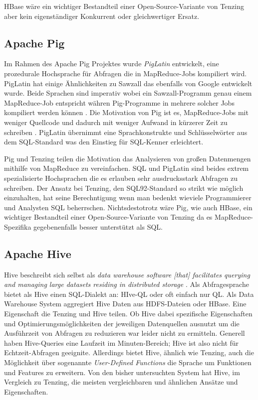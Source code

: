 \documentclass[a4paper]{article}
\begin{document}
HBase wäre ein wichtiger Bestandteil einer Open-Source-Variante von Tenzing aber kein eigenständiger Konkurrent oder gleichwertiger Ersatz.

\subsection{Apache Pig}
Im Rahmen des Apache Pig Projektes wurde \textit{PigLatin} entwickelt, eine prozedurale Hochsprache für Abfragen die in MapReduce-Jobs kompiliert wird. PigLatin hat einige Ähnlichkeiten zu Sawzall \cite{Sawzall} das ebenfalls von Google entwickelt wurde. Beide Sprachen sind imperativ wobei ein Sawzall-Programm genau einem MapReduce-Job entspricht währen Pig-Programme in mehrere solcher Jobs kompiliert werden können \cite{PigWiki}. Die Motivation von Pig ist es, MapReduce-Jobs mit weniger Quellcode und dadurch mit weniger Aufwand in kürzerer Zeit zu schreiben \cite{pdfcast}. PigLatin übernimmt eine Sprachkonstrukte und Schlüsselwörter aus dem SQL-Standard was den Einstieg für SQL-Kenner erleichtert.

Pig und Tenzing teilen die Motivation das Analysieren von großen Datenmengen mithilfe von MapReduce zu vereinfachen. SQL und PigLatin sind beides extrem spezialisierte Hochsprachen die es erlauben sehr ausdrucksstark Abfragen zu schreiben. Der Ansatz bei Tenzing, den SQL92-Standard so strikt wie möglich einzuhalten, hat seine Berechntigung wenn man bedenkt wieviele Programmierer und Analysten SQL beherrschen. Nichtsdestotrotz wäre Pig, wie auch HBase, ein wichtiger Bestandteil einer Open-Source-Variante von Tenzing da es MapReduce-Spezifika gegebenenfalls besser unterstützt als SQL.

\subsection{Apache Hive}
Hive beschreibt sich selbst als \textit{data warehouse software [that] facilitates querying and managing large datasets residing in distributed storage} \cite{HiveWiki}. Als Abfragesprache bietet als Hive einen SQL-Dialekt an: HIve-QL oder oft einfach nur QL. Als Data Warehouse System aggregiert Hive Daten aus HDFS-Dateien oder HBase. Eine Eigenschaft die Tenzing und Hive teilen. Ob Hive dabei spezifische Eigenschaften und Optimierungsmöglichkeiten der jeweiligen Datenquellen ausnutzt um die Ausführzeit von Abfragen zu reduzieren war leider nicht zu ermitteln. Generell haben Hive-Queries eine Laufzeit im Minuten-Bereich; Hive ist also nicht für Echtzeit-Abfragen geeignite. Allerdings bietet Hive, ähnlich wie Tenzing, auch die Möglichkeit über sogenannte \textit{User-Defined Functions} die Sprache um Funktionen und Features zu erweitern. Von den bisher untersuchten System hat Hive, im Vergleich zu Tenzing, die meisten vergleichbaren und ähnlichen Ansätze und Eigenschaften. 
\end{document}

